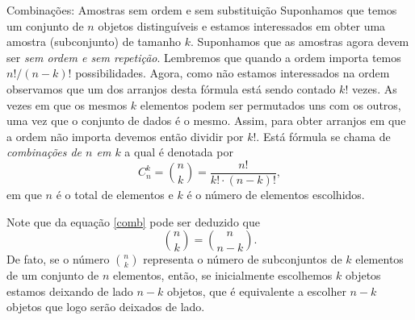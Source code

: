 \begin{frame}{Combinações: Amostras sem ordem e sem substituição} Suponhamos  que temos um conjunto de $n$ objetos distinguíveis e estamos interessados em obter uma amostra (subconjunto)  de tamanho $k.$ Suponhamos que as amostras agora devem ser {\it sem ordem e sem repetição}.  Lembremos que quando a ordem importa temos ${n!}/{(n-k)!}$ possibilidades. Agora, como não estamos interessados na ordem observamos que um dos arranjos desta fórmula está sendo contado $k!$ vezes. As vezes em que os mesmos $k$ elementos podem ser permutados uns com os outros, uma vez que o conjunto de dados é o mesmo. Assim, para obter arranjos em que a ordem não importa devemos então dividir por $k!.$ Está fórmula se chama de {\it combinações de $n$ em $k$} a qual é denotada por 
\begin{equation}
\label{comb}
    C_n^k = {n\choose k} = \frac{n!}{k!\cdot\left(n - k\right)!}, 
\end{equation}
em que  $n$ é o total de elementos e $k$ é o número de elementos escolhidos. 

Note que da equação \ref{comb} pode ser deduzido que 
\begin{equation}
\label{comb2}
{n \choose k} = {n \choose n-k} .
\end{equation}
De fato, se o número $\displaystyle{{n \choose k}}$ representa o número de subconjuntos de $k$ elementos
de um conjunto de $n$ elementos, então, se inicialmente escolhemos $k$ objetos estamos deixando de lado $n-k$ objetos, que é equivalente a escolher $n-k$ objetos que logo serão deixados de lado.
 
\end{frame}

